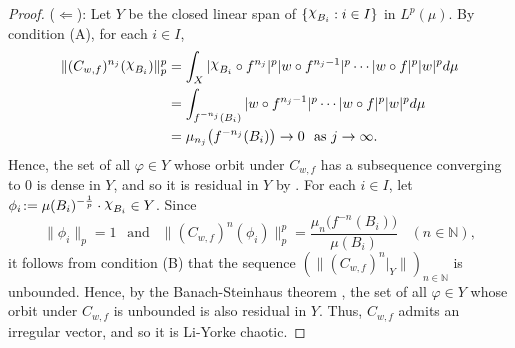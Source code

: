 \documentclass[12pt]{amsart}
\theoremstyle{theorem}
\theoremstyle{definition}
\theoremstyle{remark} \theoremstyle{question} \theoremstyle{example}
\newcommand{\N}{\mathbb{N}}
\DeclareRobustCommand{\rchi}{{\mathpalette\irchi\relax}}
\newcommand{\irchi}[2]{\raisebox{\depth}{$#1\chi$}}
\begin{document}
\begin{proof}
($\Leftarrow$): Let $Y$ be the closed linear span of $\{\rchi_{B_i} : i \in I\}$ in $L^p(\mu)$. By condition (A), for each $i \in I$,
\begin{align*}
\|(C_{w,f})^{n_j}(\rchi_{B_i})\|_p^p 
&= \int_X |\rchi_{B_i} \circ f^{n_j}|^p |w \circ f^{n_j-1}|^p \cdots |w \circ f|^p |w|^p d\mu\\
&= \int_{f^{-n_j}(B_i)} |w \circ f^{n_j-1}|^p \cdots |w \circ f|^p |w|^p d\mu\\
&= \mu_{n_j}\big(f^{-n_j}(B_i)\big) \to 0 \ \text{ as } j \to \infty.
\end{align*}
Hence, the set of all $\varphi \in Y$ whose orbit under $C_{w,f}$ has a subsequence converging to $0$ is dense in $Y$,
and so it is residual in $Y$ by \cite[Proposition~3]{BerBonMulPer15}. 
For each $i \in I$, let $\phi_i\!:= \mu(B_i)^{-\frac{1}{p}} \cdot \rchi_{B_i} \in Y$. Since
\[
\|\phi_i\|_p = 1 \ \ \text{ and } \ \ \|(C_{w,f})^n(\phi_i)\|_p^p = \frac{\mu_n\big(f^{-n}(B_i)\big)}{\mu(B_i)} \ \ \ \ (n \in \N),
\]
it follows from condition (B) that the sequence $(\|(C_{w,f})^n|_Y\|)_{n \in \N}$ is unbounded.
Hence, by the Banach-Steinhaus theorem \cite[Theorem~2.5]{WRud91}, 
the set of all $\varphi \in Y$ whose orbit under $C_{w,f}$ is unbounded is also residual in $Y$. 
Thus, $C_{w,f}$ admits an irregular vector, and so it is Li-Yorke chaotic.


\end{proof}
\end{document}
